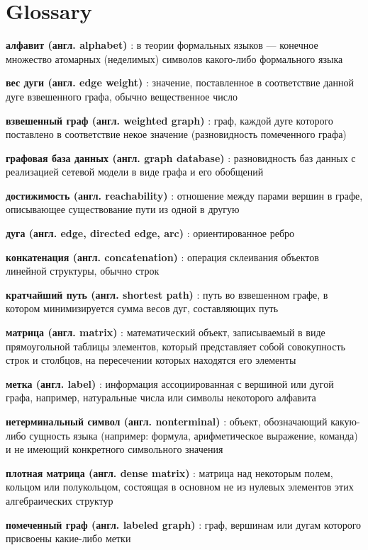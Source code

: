 \chapter*{Glossary}             %

\textbf{алфавит (англ. alphabet)} : в теории формальных языков --- конечное множество атомарных (неделимых) символов какого-либо формального языка

\textbf{вес дуги (англ. edge weight)} : значение, поставленное в соответствие данной дуге взвешенного графа, обычно вещественное число

\textbf{взвешенный граф (англ. weighted graph)} : граф, каждой дуге которого поставлено в соответствие некое значение (разновидность помеченного графа)

\textbf{графовая база данных (англ. graph database)} : разновидность баз данных с реализацией сетевой модели в виде графа и его обобщений

\textbf{достижимость (англ. reachability)} : отношение между парами вершин в графе, описывающее существование пути из одной в другую

\textbf{дуга (англ. edge, directed edge, arc)} : ориентированное ребро

\textbf{конкатенация (англ. concatenation)} : операция склеивания объектов линейной структуры, обычно строк

\textbf{кратчайший путь (англ. shortest path)} : путь во взвешенном графе, в котором минимизируется сумма весов дуг, составляющих путь

\textbf{матрица (англ. matrix)} :  математический объект, записываемый в виде прямоугольной таблицы элементов, который представляет собой совокупность строк и столбцов, на пересечении которых находятся его элементы

\textbf{метка (англ. label)} : информация ассоциированная с вершиной или дугой графа, например, натуральные числа или символы некоторого алфавита

\textbf{нетерминальный символ (англ. nonterminal)} : объект, обозначающий какую-либо сущность языка (например: формула, арифметическое выражение, команда) и не имеющий конкретного символьного значения

\textbf{плотная матрица (англ. dense matrix)} : матрица над некоторым полем, кольцом или полукольцом, состоящая в основном не из нулевых элементов этих алгебраических структур

\textbf{помеченный граф (англ. labeled graph)} : граф, вершинам или дугам которого присвоены какие-либо метки

